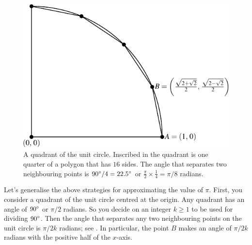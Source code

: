 \documentclass[a4paper,oneside,12pt]{article}
\begin{document}
\begin{figure}[!htbp]
\centering
\includegraphics[scale=1.1]{image/05/quadrant.pdf}
\caption{%
  A quadrant of the unit circle.  Inscribed in the quadrant is one
  quarter of a polygon that has $16$ sides.  The angle that separates
  two neighbouring points is ${90}^{\circ} / 4 = {22.5}^{\circ}$ or
  $\frac{\pi}{2} \times \frac{1}{4} = \pi / 8$ radians.
}
\label{fig:quadrant_inscribed_quarter_polygon_22_degrees}
\end{figure}

Let's generalise the above strategies for approximating the value of
$\pi$.  First, you consider a quadrant of the unit circle centred at
the origin.  Any quadrant has an angle of ${90}^{\circ}$ or
$\pi / 2$ radians.  So you decide on an integer $k \geq 1$ to be used
for dividing ${90}^{\circ}$.  Then the angle that separates any two
neighbouring points on the unit circle is $\pi / 2k$ radians; see
.  In particular, the point $B$
makes an angle of $\pi / 2k$ radians with the positive half of the
$x$-axis.
\end{document}
